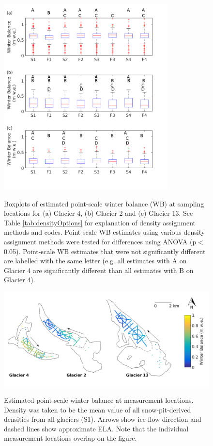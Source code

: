 \documentclass{sfuthesis}
\begin{document}
\begin{figure}[H]
	\centering
	\includegraphics[width = 0.8\textwidth]{AllSWEopts_boxplot.png}\\
	\caption{Boxplots of estimated point-scale winter balance (WB) at sampling locations for (a) Glacier 4, (b) Glacier 2 and (c) Glacier 13. See Table \ref{tab:densityOptions} for explanation of density assignment methods and codes. Point-scale WB estimates using various density assignment methods were tested for differences using ANOVA (p$<$0.05). Point-scale WB estimates that were not significantly different are labelled with the same letter (e.g. all estimates with A on Glacier 4 are significantly different than all estimates with B on Glacier 4).}
	\label{fig:AllSWEopts_boxplot}
\end{figure}


\begin{figure}[H]
	\centering
	\includegraphics[width = \textwidth]{SWEmap_opt2.png}\\
	\caption{Estimated point-scale winter balance at measurement locations. Density was taken to be the mean value of all snow-pit-derived densities from all glaciers (S1). Arrows show ice-flow direction and dashed lines show approximate ELA. Note that the individual measurement locations overlap on the figure.}
	\label{fig:SWEmap_S1}
\end{figure}
\end{document}
